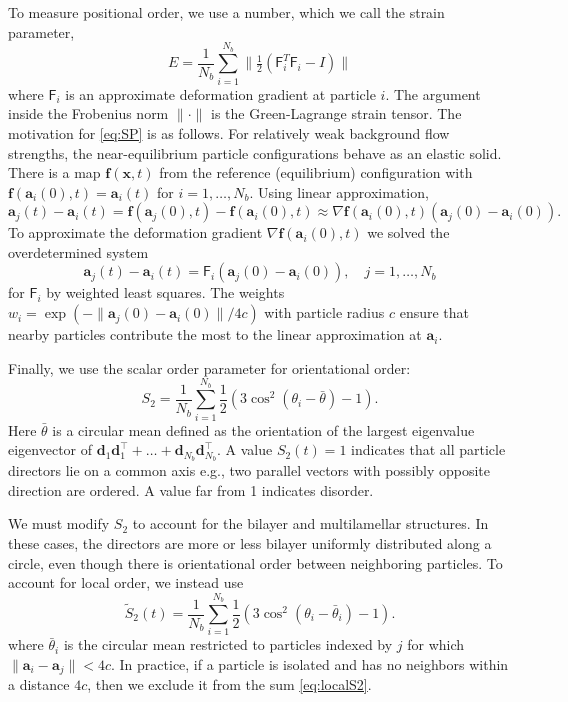 \documentclass[prb,preprint,showpacs,preprintnumbers,amsmath,amssymb,longbibliography]{revtex4-1}
\renewcommand{\aa}{\mathbf{a}}
\newcommand{\dd}{\mathbf{d}}
\newcommand{\ff}{\mathbf{f}}
\newcommand{\xx}{\mathbf{x}}
\begin{document}
To measure positional order, we use a number,
which we call the strain parameter, 
\begin{equation}
\label{eq:SP}
E = \frac{1}{N_b} \sum_{i=1}^{N_b}
\|\tfrac{1}{2}(\mathsf{F}_i^T \mathsf{F}_i - I)\|
\end{equation}
where $\mathsf{F}_i$ is an 
approximate deformation gradient at particle $i$.
The argument inside the Frobenius norm $\| \cdot \|$
is the Green-Lagrange strain tensor.
The motivation for  \eqref{eq:SP} is as follows.
For relatively weak background flow strengths, the near-equilibrium particle
configurations behave as an elastic solid.  There is a map $\ff(\xx,t)$
from the reference (equilibrium) configuration with $\ff(\aa_i(0),t) = \aa_i(t)$
for $i = 1,\dots,N_b$.  Using linear approximation,
\[
\aa_j(t) - \aa_i(t) = \ff(\aa_j(0),t) - \ff(\aa_i(0),t)
\approx \nabla \ff(\aa_i(0),t)(\aa_j(0) - \aa_i(0)).
\]
To approximate
the deformation gradient $\nabla \ff(\aa_i(0),t)$
we solved the overdetermined system 
\[
\aa_j(t) - \aa_i(t) = \mathsf{F}_i(\aa_j(0) - \aa_i(0)),\quad j = 1,\dots, N_b  
\]
for $\mathsf{F}_i$ by weighted least squares. The weights  
$w_i = \exp(-\|\aa_j(0) - \aa_i(0)\|/4c)$ with particle radius $c$
ensure that nearby particles contribute the most to the linear approximation at $\aa_i$. 

Finally, we use the scalar order parameter for orientational order:
\begin{equation}
  \label{eq:S2}
S_2 = \frac{1}{N_b} \sum_{i=1}^{N_b} \frac{1}{2}(3\cos^2(\theta_i - \bar \theta) - 1).
\end{equation}
Here $\bar \theta$ is a circular mean defined as the
orientation of the largest eigenvalue eigenvector of 
$\dd_1\dd_1^\top + \dots + \dd_{N_b}\dd_{N_b}^\top$.
A value $S_2(t) = 1$ indicates 
that all particle directors lie on a common axis e.g.,
two parallel vectors with possibly opposite direction are ordered. 
A value far from 1 indicates disorder.

We must modify $S_2$ to account for the bilayer and
multilamellar structures.  In these cases, the directors 
are more or less bilayer uniformly distributed along a circle, even though
there is orientational order between neighboring particles.
To account for local order, we instead use
\begin{equation}
  \label{eq:localS2}
\tilde{S}_2(t) = \frac{1}{N_b} \sum_{i=1}^{N_b}
\frac{1}{2}(3\cos^2(\theta_i - \bar \theta_i) - 1).
\end{equation}
where $\bar \theta_i$ is the circular mean restricted to particles
indexed by $j$ for which $\|\aa_i - \aa_j\| < 4c$. In practice, if a particle is
isolated and has no neighbors within a distance $4c$, then we exclude it from
the sum \eqref{eq:localS2}. 
\end{document}
